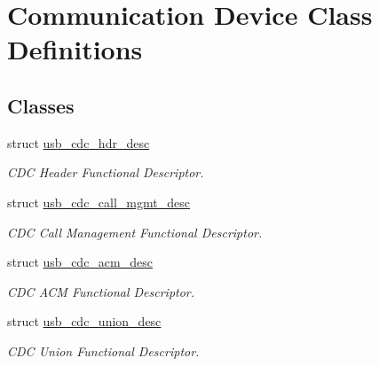 \hypertarget{group__cdc__protocol__group}{}\section{Communication Device Class Definitions}
\label{group__cdc__protocol__group}
\subsection*{Classes}
\begin{DoxyCompactItemize}
\item 
struct \hyperlink{structusb__cdc__hdr__desc}{usb\+\_\+cdc\+\_\+hdr\+\_\+desc}
\begin{DoxyCompactList}\small\item\em C\+DC Header Functional Descriptor. \end{DoxyCompactList}\item 
struct \hyperlink{structusb__cdc__call__mgmt__desc}{usb\+\_\+cdc\+\_\+call\+\_\+mgmt\+\_\+desc}
\begin{DoxyCompactList}\small\item\em C\+DC Call Management Functional Descriptor. \end{DoxyCompactList}\item 
struct \hyperlink{structusb__cdc__acm__desc}{usb\+\_\+cdc\+\_\+acm\+\_\+desc}
\begin{DoxyCompactList}\small\item\em C\+DC A\+CM Functional Descriptor. \end{DoxyCompactList}\item 
struct \hyperlink{structusb__cdc__union__desc}{usb\+\_\+cdc\+\_\+union\+\_\+desc}
\begin{DoxyCompactList}\small\item\em C\+DC Union Functional Descriptor. \end{DoxyCompactList}\end{DoxyCompactItemize}

